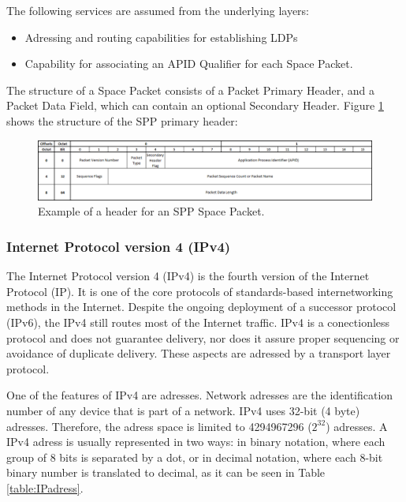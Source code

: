 The following services are assumed from the underlying layers:

\begin{itemize}
\item Adressing and routing capabilities for establishing LDPs
\item Capability for associating an APID Qualifier for each Space Packet.
\end{itemize}

The structure of a Space Packet consists of a Packet Primary Header, and a Packet Data Field, which can contain an optional Secondary Header. Figure \ref{fig:SPPheader} shows the structure of the SPP primary header:

\begin{figure}[H]
\begin{center}
\includegraphics[scale=0.5]{SPP_header.PNG}
\caption[SPP header]{Example of a header for an SPP Space Packet.}
\label{fig:SPPheader}
\end{center}
\end{figure}

\subsubsection*{Internet Protocol version 4 (IPv4)\cite{IP}}
The Internet Protocol version 4 (IPv4) is the fourth version of the Internet Protocol (IP). It is one of the core protocols of standards-based internetworking methods in the Internet. Despite the ongoing deployment of a successor protocol (IPv6), the IPv4 still routes most of the Internet traffic. IPv4 is a conectionless protocol and does not guarantee delivery, nor does it assure proper sequencing or avoidance of duplicate delivery. These aspects are adressed by a transport layer protocol.

One of the features of IPv4 are adresses. Network adresses are the identification number of any device that is part of a network. IPv4 uses 32-bit (4 byte) adresses. Therefore, the adress space is limited to 4294967296 ($2^{32}$) adresses. A IPv4 adress is usually represented in two ways: in binary notation, where each group of 8 bits is separated by a dot, or in decimal notation, where each 8-bit binary number is translated to decimal, as it can be seen in Table \ref{table:IPadress}.

